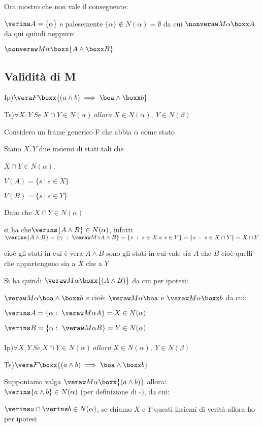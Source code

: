Ora mostro che non vale il conseguente:

$\verins A=\{\alpha\}$ e palesemente $\{\alpha\}\notin N(\alpha)=\emptyset$
da cui $\nonveraw M{\alpha}{\boxx A}$ da qui quindi neppure:

$\nonveraw M{\alpha}{\boxx{A\wedge\boxx B}}$


\subsection{Validità di M}

Ip)$\vera F{\boxx{(a\wedge b)\implies\boa\wedge\boxx b}}$ 

Ts)$\forall X,Y\ Se\ X\cap Y\in N(\alpha)\ allora\ X\in N(\alpha),\ Y\in N(\beta)$			

Considero un frame generico F che abbia $\alpha$ come stato

Siano $X,Y$ due insiemi di stati tali che

$X\cap Y\in N(\alpha)$. 

$V(A)=\{s\ |\ s\in X\}$

$V(B)=\{s\ |\ s\in Y\}$

Dato che $X\cap Y\in N(\alpha)$

si ha che$\verins{A\wedge B}\in N(\alpha)$, infatti $\verins{A\wedge B}=\{\gamma\ :\ \veraw M{\gamma}{A\wedge B\}}=\{s\ :\ s\in X\ e\ s\in Y\}=\{s\ :\ s\in X\cap Y\}=X\cap Y$

cioè gli stati in cui è vera $A\wedge B$ sono gli stati in cui vale
sia $A$ che $B$ cioè quelli che appartengono sia a $X$ che a $Y$

Si ha quindi $\veraw M{\alpha}{\boxx{(A\wedge B)}}$ da cui per ipotesi:

$\veraw M{\alpha}{\boa\wedge\boxx b}$ e cioè: $\veraw M{\alpha}{\boa}$
e $\veraw M{\alpha}{\boxx b}$ da cui:

$\verins A=\{\alpha:\ \veraw M{\alpha}A\}=X\in N(\alpha)$

$\verins B=\{\alpha:\ \veraw M{\alpha}B\}=Y\in N(\alpha)$	\\
\\
Ip)$\forall X,Y\ Se\ X\cap Y\in N(\alpha)\ allora\ X\in N(\alpha),\ Y\in N(\beta)$

Ts)$\vera F{\boxx{(a\wedge b)\implies\boa\wedge\boxx b}}$

Supponiamo valga $\veraw M{\alpha}{\boxx{(a\wedge b)}}$ allora: \\
$\verins{a\wedge b}\in N(\alpha)$ (per definizione di $\square)$,
da cui:

$\verins a\cap\verins b\in N(\alpha)$, se chiamo $X$ e $Y$ questi
insiemi di verità allora ho per ipotesi

